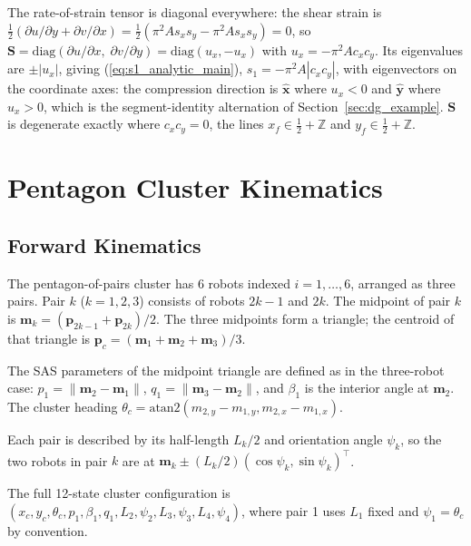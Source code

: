 \documentclass[lettersize,journal]{IEEEtran}
\begin{document}
The rate-of-strain tensor is diagonal everywhere: the shear strain is
$\tfrac{1}{2}(\partial u/\partial y + \partial v/\partial x) =
\tfrac{1}{2}(\pi^2 A s_x s_y - \pi^2 A s_x s_y) = 0$, so $\mathbf{S} =
\mathrm{diag}(\partial u/\partial x,\; \partial v/\partial y) =
\mathrm{diag}(u_x, -u_x)$ with $u_x = -\pi^2 A c_x c_y$. Its
eigenvalues are $\pm|u_x|$, giving
(\ref{eq:s1_analytic_main}), $s_1 = -\pi^2 A |c_x c_y|$, with
eigenvectors on the coordinate axes: the compression direction is
$\hat{\mathbf{x}}$ where $u_x < 0$ and $\hat{\mathbf{y}}$ where $u_x >
0$, which is the segment-identity alternation of
Section~\ref{sec:dg_example}. $\mathbf{S}$ is degenerate exactly where
$c_x c_y = 0$, the lines $x_f \in \tfrac{1}{2} + \mathbb{Z}$ and $y_f
\in \tfrac{1}{2} + \mathbb{Z}$.


\section{Pentagon Cluster Kinematics}
\label{app:kinematics}

\subsection{Forward Kinematics}

The pentagon-of-pairs cluster has 6 robots indexed $i = 1, \ldots, 6$, arranged
as three pairs. Pair $k$ ($k = 1, 2, 3$) consists of robots $2k-1$ and $2k$.
The midpoint of pair $k$ is $\mathbf{m}_k = (\mathbf{p}_{2k-1} +
\mathbf{p}_{2k})/2$. The three midpoints form a triangle; the centroid of that
triangle is $\mathbf{p}_c = (\mathbf{m}_1 + \mathbf{m}_2 + \mathbf{m}_3)/3$.

The SAS parameters of the midpoint triangle are defined as in the three-robot
case: $p_1 = \|\mathbf{m}_2 - \mathbf{m}_1\|$, $q_1 = \|\mathbf{m}_3 -
\mathbf{m}_2\|$, and $\beta_1$ is the interior angle at $\mathbf{m}_2$.
The cluster heading $\theta_c = \text{atan2}(m_{2,y} - m_{1,y},
m_{2,x} - m_{1,x})$.

Each pair is described by its half-length $L_k/2$ and orientation angle
$\psi_k$, so the two robots in pair $k$ are at $\mathbf{m}_k \pm (L_k/2)
(\cos\psi_k, \sin\psi_k)^\top$.

The full 12-state cluster configuration is
$(x_c, y_c, \theta_c, p_1, \beta_1, q_1, L_2, \psi_2, L_3, \psi_3,
L_4, \psi_4)$, where pair 1 uses $L_1$ fixed and $\psi_1 = \theta_c$ by
convention.
\end{document}
